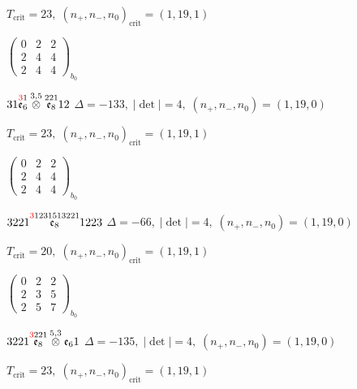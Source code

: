 \documentclass[10pt]{article}
\begin{document}
\hspace{1em}$T_{\text{crit}}=23,\; (n_+,n_-,n_0)_{\text{crit}}=(1,19,1)$

\hspace{2em}$\left(\begin{smallmatrix}0 & 2 & 2 \\ 2 & 4 & 4 \\ 2 & 4 & 4\end{smallmatrix}\right)_{\!b_0}$

\smallskip

$31\overset{\textcolor{red}{3}1}{\mathfrak{e}_6}\overset{3,5}{\otimes}\overset{221}{\mathfrak{e}_8}12$ \quad $\Delta=-133,\; |\det|=4,\; (n_+,n_-,n_0)=(1,19,0)$

\hspace{1em}$T_{\text{crit}}=23,\; (n_+,n_-,n_0)_{\text{crit}}=(1,19,1)$

\hspace{2em}$\left(\begin{smallmatrix}0 & 2 & 2 \\ 2 & 4 & 4 \\ 2 & 4 & 4\end{smallmatrix}\right)_{\!b_0}$

\smallskip

$3221\overset{\textcolor{red}{3}1231513221}{\mathfrak{e}_8}1223$ \quad $\Delta=-66,\; |\det|=4,\; (n_+,n_-,n_0)=(1,19,0)$

\hspace{1em}$T_{\text{crit}}=20,\; (n_+,n_-,n_0)_{\text{crit}}=(1,19,1)$

\hspace{2em}$\left(\begin{smallmatrix}0 & 2 & 2 \\ 2 & 3 & 5 \\ 2 & 5 & 7\end{smallmatrix}\right)_{\!b_0}$

\smallskip

$3221\overset{\textcolor{red}{3}221}{\mathfrak{e}_8}\overset{5,3}{\otimes}\mathfrak{e}_61$ \quad $\Delta=-135,\; |\det|=4,\; (n_+,n_-,n_0)=(1,19,0)$

\hspace{1em}$T_{\text{crit}}=23,\; (n_+,n_-,n_0)_{\text{crit}}=(1,19,1)$
\end{document}
